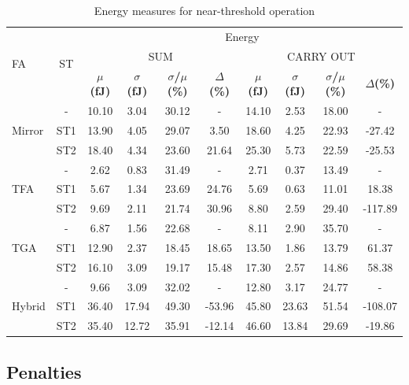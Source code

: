 \documentclass[pgmicro,mestrado,english]{iiufrgs}
\begin{document}
\begin{table}[]
\centering
\caption{Energy measures for near-threshold operation}
\label{energiaNT}
\begin{tabular}{lccccccccc}
\hline
\multirow{3}{*}{FA} & \multirow{3}{*}{ST} & \multicolumn{8}{c}{Energy} \\ \cline{3-10} 
& & \multicolumn{4}{c}{SUM} & \multicolumn{4}{c}{CARRY OUT} \\ \cline{3-10}  
& & \textbf{$\mu$(fJ)} & \textbf{$\sigma$(fJ)} & \textbf{$\sigma$/$\mu$(\%)} & \textbf{$\Delta$(\%)} & \textbf{$\mu$(fJ)} & \textbf{$\sigma$(fJ)} & \textbf{$\sigma$/$\mu$(\%)} & \textbf{$\Delta$(\%)} \\ \hline
\multirow{3}{*}{Mirror} & - & 10.10 & 3.04 & 30.12 & - & 14.10 & 2.53 & 18.00 & - \\ \cline{2-10} 
& ST1 & 13.90 & 4.05 & 29.07 & 3.50 & 18.60 & 4.25 & 22.93 & -27.42 \\ \cline{2-10} 
& ST2 & 18.40 & 4.34 & 23.60 & 21.64 & 25.30 & 5.73 & 22.59 & -25.53 \\ \hline
\multirow{3}{*}{TFA} & - & 2.62 & 0.83 & 31.49 & - & 2.71 & 0.37 & 13.49 & - \\ \cline{2-10} 
& ST1 & 5.67 & 1.34 & 23.69 & 24.76 & 5.69 & 0.63 & 11.01 & 18.38 \\ \cline{2-10} 
& ST2 & 9.69 & 2.11 & 21.74 & 30.96 & 8.80 & 2.59 & 29.40 & -117.89 \\ \hline
\multirow{3}{*}{TGA} & - & 6.87 & 1.56 & 22.68 & - & 8.11 & 2.90 & 35.70 & - \\ \cline{2-10} 
& ST1 & 12.90 & 2.37 & 18.45 & 18.65 & 13.50 & 1.86 & 13.79 & 61.37 \\ \cline{2-10} 
& ST2 & 16.10 & 3.09 & 19.17 & 15.48 & 17.30 & 2.57 & 14.86 & 58.38 \\ \hline
\multirow{3}{*}{Hybrid} & - & 9.66 & 3.09 & 32.02 & - & 12.80 & 3.17 & 24.77 & - \\ \cline{2-10} 
& ST1 & 36.40 & 17.94 & 49.30 & -53.96 & 45.80 & 23.63 & 51.54 & -108.07 \\ \cline{2-10} 
& ST2 & 35.40 & 12.72 & 35.91 & -12.14 & 46.60 & 13.84 & 29.69 & -19.86 \\ \hline
\end{tabular}
\end{table}

\vspace{-1.5em}

 \subsection{Penalties}
 
\end{document}
